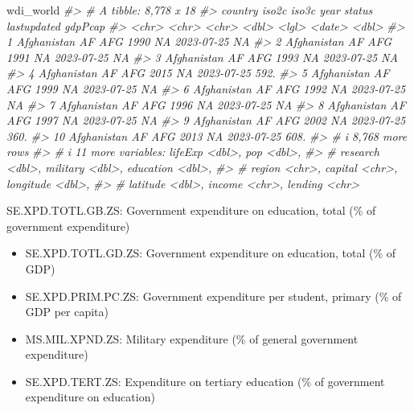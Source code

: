 \documentclass[
  xelatex, ja=standard]{bxjsbook}
\newenvironment{Shaded}{\begin{snugshade}}{\end{snugshade}}
\newcommand{\CommentTok}[1]{\textcolor[rgb]{0.56,0.35,0.01}{\textit{#1}}}
\newcommand{\NormalTok}[1]{#1}
\theoremstyle{definition}
\theoremstyle{definition}
\theoremstyle{definition}
\theoremstyle{definition}
\theoremstyle{remark}
\begin{document}
\begin{Shaded}
\begin{Highlighting}[]
\NormalTok{wdi\_world}
\CommentTok{\#\textgreater{} \# A tibble: 8,778 x 18}
\CommentTok{\#\textgreater{}    country     iso2c iso3c  year status lastupdated gdpPcap}
\CommentTok{\#\textgreater{}    \textless{}chr\textgreater{}       \textless{}chr\textgreater{} \textless{}chr\textgreater{} \textless{}dbl\textgreater{} \textless{}lgl\textgreater{}  \textless{}date\textgreater{}        \textless{}dbl\textgreater{}}
\CommentTok{\#\textgreater{}  1 Afghanistan AF    AFG    1990 NA     2023{-}07{-}25      NA }
\CommentTok{\#\textgreater{}  2 Afghanistan AF    AFG    1991 NA     2023{-}07{-}25      NA }
\CommentTok{\#\textgreater{}  3 Afghanistan AF    AFG    1993 NA     2023{-}07{-}25      NA }
\CommentTok{\#\textgreater{}  4 Afghanistan AF    AFG    2015 NA     2023{-}07{-}25     592.}
\CommentTok{\#\textgreater{}  5 Afghanistan AF    AFG    1999 NA     2023{-}07{-}25      NA }
\CommentTok{\#\textgreater{}  6 Afghanistan AF    AFG    1992 NA     2023{-}07{-}25      NA }
\CommentTok{\#\textgreater{}  7 Afghanistan AF    AFG    1996 NA     2023{-}07{-}25      NA }
\CommentTok{\#\textgreater{}  8 Afghanistan AF    AFG    1997 NA     2023{-}07{-}25      NA }
\CommentTok{\#\textgreater{}  9 Afghanistan AF    AFG    2002 NA     2023{-}07{-}25     360.}
\CommentTok{\#\textgreater{} 10 Afghanistan AF    AFG    2013 NA     2023{-}07{-}25     608.}
\CommentTok{\#\textgreater{} \# i 8,768 more rows}
\CommentTok{\#\textgreater{} \# i 11 more variables: lifeExp \textless{}dbl\textgreater{}, pop \textless{}dbl\textgreater{},}
\CommentTok{\#\textgreater{} \#   research \textless{}dbl\textgreater{}, military \textless{}dbl\textgreater{}, education \textless{}dbl\textgreater{},}
\CommentTok{\#\textgreater{} \#   region \textless{}chr\textgreater{}, capital \textless{}chr\textgreater{}, longitude \textless{}dbl\textgreater{},}
\CommentTok{\#\textgreater{} \#   latitude \textless{}dbl\textgreater{}, income \textless{}chr\textgreater{}, lending \textless{}chr\textgreater{}}
\end{Highlighting}
\end{Shaded}

SE.XPD.TOTL.GB.ZS: Government expenditure on education, total (\% of government expenditure)

\begin{itemize}
\item
  SE.XPD.TOTL.GD.ZS: Government expenditure on education, total (\% of GDP)
\item
  SE.XPD.PRIM.PC.ZS: Government expenditure per student, primary (\% of GDP per capita)
\item
  MS.MIL.XPND.ZS: Military expenditure (\% of general government expenditure)
\item
  SE.XPD.TERT.ZS: Expenditure on tertiary education (\% of government expenditure on education)
\end{itemize}
\end{document}
